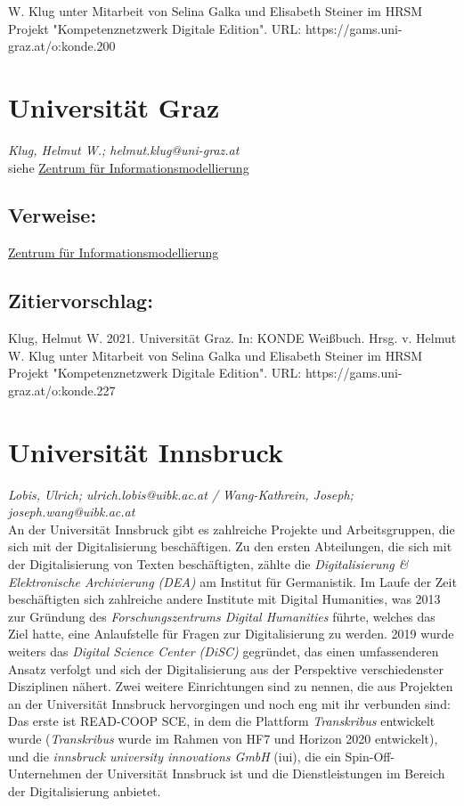 \documentclass{article}
\begin{document}
W. Klug unter Mitarbeit von Selina Galka und Elisabeth Steiner im HRSM Projekt "Kompetenznetzwerk Digitale Edition". URL: https://gams.uni-graz.at/o:konde.200\newpage\section*{Universität Graz} \emph{Klug, Helmut W.; helmut.klug@uni-graz.at}\\
        
    siehe \href{http://gams.uni-graz.at/o:konde.217}{Zentrum für Informationsmodellierung}\\
            
        \subsection*{Verweise:}\href{https://gams.uni-graz.at/o:konde.217}{Zentrum für Informationsmodellierung}\subsection*{Zitiervorschlag:}Klug, Helmut W. 2021. Universität Graz. In: KONDE Weißbuch. Hrsg. v. Helmut W. Klug unter Mitarbeit von Selina Galka und Elisabeth Steiner im HRSM Projekt "Kompetenznetzwerk Digitale Edition". URL: https://gams.uni-graz.at/o:konde.227\newpage\section*{Universität Innsbruck} \emph{Lobis, Ulrich; ulrich.lobis@uibk.ac.at / Wang-Kathrein, Joseph;
                  joseph.wang@uibk.ac.at}\\
        
    An der Universität Innsbruck gibt es zahlreiche Projekte und Arbeitsgruppen, die
                  sich mit der Digitalisierung beschäftigen. Zu den ersten Abteilungen, die sich mit
                  der Digitalisierung von Texten beschäftigten, zählte die \emph{Digitalisierung \& Elektronische Archivierung (DEA)} am Institut für
                  Germanistik. Im Laufe der Zeit beschäftigten sich zahlreiche andere Institute mit
                  Digital Humanities, was 2013 zur Gründung des \emph{Forschungszentrums
                     Digital Humanities} führte, welches das Ziel hatte, eine Anlaufstelle für
                  Fragen zur Digitalisierung zu werden. 2019 wurde weiters das \emph{Digital Science Center (DiSC)} gegründet, das einen umfassenderen Ansatz
                  verfolgt und sich der Digitalisierung aus der Perspektive verschiedenster
                  Disziplinen nähert. Zwei weitere Einrichtungen sind zu nennen, die aus Projekten
                  an der Universität Innsbruck hervorgingen und noch eng mit ihr verbunden sind: Das
                  erste ist READ-COOP SCE, in dem die Plattform \emph{Transkribus}
                  entwickelt wurde (\emph{Transkribus} wurde im Rahmen von HF7 und
                  Horizon 2020 entwickelt), und die \emph{innsbruck university
                     innovations GmbH} (iui), die ein Spin-Off-Unternehmen der Universität
                  Innsbruck ist und die Dienstleistungen im Bereich der Digitalisierung
                  anbietet.\\
            
\end{document}
